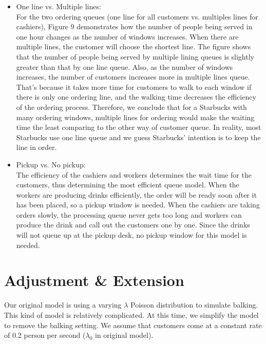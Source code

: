 \documentclass[a4paper]{article}
\begin{document}
\begin{itemize}
\item One line vs. Multiple lines:\\
For the two ordering queues (one line for all customers vs. multiples lines for cashiers), Figure 9 demonstrates how the number of people being served in one hour changes as the number of windows increases. When there are multiple lines, the customer will choose the shortest line. The figure shows that the number of people being served by multiple lining queues is slightly greater than that by one line queue. Also, as the number of windows increases, the number of customers increases more in multiple lines queue. That's because it takes more time for customers to walk to each window if there is only one ordering line, and the walking time decreases the efficiency of the ordering process. Therefore, we conclude that for a Starbucks with many ordering windows, multiple lines for ordering would make the waiting time the least comparing to the other way of customer queue. In reality, most Starbucks use one line queue and we guess Starbucks' intention is to keep the line in order.

\item Pickup vs. No pickup:\\
The efficiency of the cashiers and workers determines the wait time for the customers, thus determining the most efficient queue model. When the workers are producing drinks efficiently, the order will be ready soon after it has been placed, so a pickup window is needed. When the cashiers are taking orders slowly, the processing queue never gets too long and workers can produce the drink and call out the customers one by one. Since the drinks will not queue up at the pickup desk, no pickup window for this model is needed.
\end{itemize}

\section{Adjustment \& Extension}

Our original model is using a varying $\lambda$ Poisson distribution to simulate balking. This kind of model is relatively complicated. At this time, we simplify the model to remove the balking setting. We assume that customers come at a constant rate of 0.2 person per second ($\lambda_0$ in original model).
\end{document}
